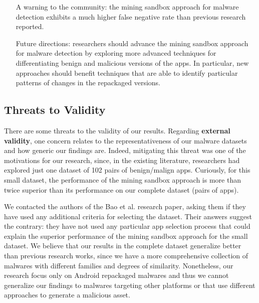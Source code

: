 \begin{itemize}
  \item[A warning to the community:] the mining sandbox approach for malware detection exhibits a much higher false negative rate  than previous research reported. 

  \item[Future directions:] researchers should advance the mining sandbox approach for malware detection by exploring more advanced techniques for differentiating
    benign and malicious versions of the apps. In particular, new approaches should benefit techniques that are able to identify particular patterns of changes
    in the repackaged versions. 
\end{itemize}  


\subsection{Threats to Validity}\label{sec:threats}


There are some threats to the validity of our results.
Regarding {\bf external validity}, one concern relates to the 
representativeness of our malware datasets and how generic our findings are.
Indeed, mitigating this threat was one of the motivations for our research,
since, in the existing literature, researchers had explored just
one dataset of 102 pairs of benign/malign apps. Curiously,
for this small dataset, the performance of the
mining sandbox approach is more than twice superior
than its performance on our complete dataset (\apps pairs of
apps).

We contacted the authors of the Bao et al. research paper, asking them
if they have used any additional criteria for selecting the
dataset. Their answers suggest the contrary: they have not used
any particular app selection process that
could explain the superior performance of the mining
sandbox approach for the small dataset. We believe that
our results in the complete dataset generalize better than previous research works,
since we have a more comprehensive collection of malwares with different
families and degrees of similarity. Nonetheless, our
research focus only on Android repackaged malwares and thus we
cannot generalize our findings to malwares targeting
other platforms or that use different approaches to
generate a malicious asset.



